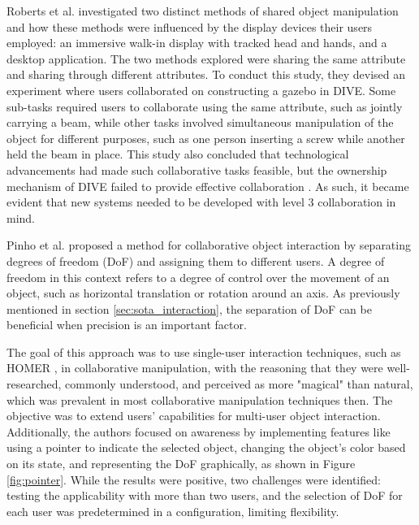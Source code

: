     Roberts et al. \cite{robertsConstructingGazeboSupporting2003} investigated two distinct methods of shared object manipulation and how these methods were influenced by the display devices their users employed: an immersive walk-in display with tracked head and hands, and a desktop application. The two methods explored were sharing the same attribute and sharing through different attributes. To conduct this study, they devised an experiment where users collaborated on constructing a gazebo in DIVE. Some sub-tasks required users to collaborate using the same attribute, such as jointly carrying a beam, while other tasks involved simultaneous manipulation of the object for different purposes, such as one person inserting a screw while another held the beam in place. This study also concluded that technological advancements had made such collaborative tasks feasible, but the ownership mechanism of DIVE failed to provide effective collaboration \cite{robertsSupportingCloselyCoupled2005a}. As such, it became evident that new systems needed to be developed with level 3 collaboration in mind.

    Pinho et al. \cite{pinhoCooperativeObjectManipulation2002, pinhoCooperativeObjectManipulation2008} proposed a method for collaborative object interaction by separating degrees of freedom (DoF) and assigning them to different users. A degree of freedom in this context refers to a degree of control over the movement of an object, such as horizontal translation or rotation around an axis. As previously mentioned in section \ref{sec:sota_interaction}, the separation of DoF can be beneficial when precision is an important factor.
    
    The goal of this approach was to use single-user interaction techniques, such as HOMER \cite{bowmanEvaluationTechniquesGrabbing1997, mossel3DTouchHOMERSIntuitive2013}, in collaborative manipulation, with the reasoning that they were well-researched, commonly understood, and perceived as more "magical" than natural, which was prevalent in most collaborative manipulation techniques then. The objective was to extend users' capabilities for multi-user object interaction. Additionally, the authors focused on awareness by implementing features like using a pointer to indicate the selected object, changing the object's color based on its state, and representing the DoF graphically, as shown in Figure \ref{fig:pointer}. While the results were positive, two challenges were identified: testing the applicability with more than two users, and the selection of DoF for each user was predetermined in a configuration, limiting flexibility.

